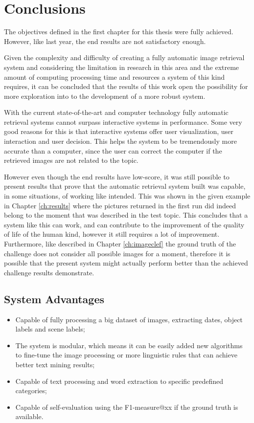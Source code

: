 \cleardoublepage
\chapter{Conclusions}
\label{ch:conclusions}



The objectives defined in the first chapter for this thesis were fully achieved. However, like last year, the end results are not satisfactory enough.


Given the complexity and difficulty of creating a fully automatic image retrieval system and considering the limitation in research in this area and the extreme amount of computing processing time and resources a system of this kind requires, it can be concluded that the results of this work open the possibility for more exploration into to the development of a more robust system.


With the current state-of-the-art and computer technology fully automatic retrieval systems cannot surpass interactive systems in performance. Some very good reasons for this is that interactive systems offer user visualization, user interaction and user decision. This helps the system to be tremendously more accurate than a computer, since the user can correct the computer if the retrieved images are not related to the topic.


However even though the end results have low-score, it was still possible to present results that prove that the automatic retrieval system built was capable, in some situations, of working like intended. This was shown in the given example in Chapter \ref{ch:results} where the pictures returned in the first run did indeed belong to the moment that was described in the test topic. This concludes that a system like this can work, and can contribute to the improvement of the quality of life of the human kind, however it still requires a lot of improvement. Furthermore, like described in Chapter \ref{ch:imageclef} the ground truth of the challenge does not consider all possible images for a moment, therefore it is possible that the present system might actually perform better than the achieved challenge results demonstrate.



\section{System Advantages}

\begin{itemize}
    \itemsep0em
    \item Capable of fully processing a big dataset of images, extracting dates, object labels and scene labels;
    \item The system is modular, which means it can be easily added new algorithms to fine-tune the image processing or more linguistic rules that can achieve better text mining results;
    \item Capable of text processing and word extraction to specific predefined categories;
    \item Capable of self-evaluation using the F1-measure@xx if the ground truth is available.
\end{itemize}


